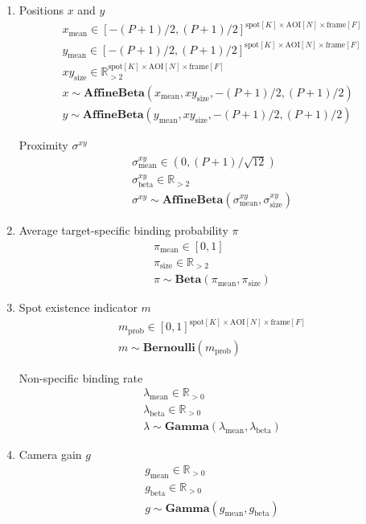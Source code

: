 \begin{enumerate}
    \item Positions $x$ and $y$
    \begin{gather*}
        x_\mathrm{mean} \in [-(P+1)/2, (P+1)/2]^{\mathrm{spot}[K] \times \mathrm{AOI}[N] \times \mathrm{frame}[F]} \\
        y_\mathrm{mean} \in [-(P+1)/2, (P+1)/2]^{\mathrm{spot}[K] \times \mathrm{AOI}[N] \times \mathrm{frame}[F]} \\
        xy_\mathrm{size} \in \mathbb{R}_{>2}^{\mathrm{spot}[K] \times \mathrm{AOI}[N] \times \mathrm{frame}[F]} \\
        x \sim \mathbf{AffineBeta} \left( x_\mathrm{mean}, xy_\mathrm{size}, -(P+1)/2, (P+1)/2 \right) \\
        y \sim \mathbf{AffineBeta} \left( y_\mathrm{mean}, xy_\mathrm{size}, -(P+1)/2, (P+1)/2 \right)
    \end{gather*}
    
    Proximity $\sigma^{xy}$
    \begin{gather*}
        \sigma^{xy}_\mathrm{mean} \in (0, (P+1) / \sqrt{12}) \\
        \sigma^{xy}_\mathrm{beta} \in \mathbb{R}_{>2} \\
        \sigma^{xy} \sim \mathbf{AffineBeta}(\sigma^{xy}_\mathrm{mean}, \sigma^{xy}_\mathrm{size})
    \end{gather*}
    
    \item Average target-specific binding probability $\pi$
    \begin{gather*}
        \pi_\mathrm{mean} \in [0, 1] \\
        \pi_\mathrm{size} \in \mathbb{R}_{>2} \\
        \pi \sim \mathbf{Beta}(\pi_\mathrm{mean}, \pi_\mathrm{size})
    \end{gather*}
    
    \item Spot existence indicator $m$
    \begin{gather*}
        m_\mathrm{prob} \in [ 0, 1 ]^{\mathrm{spot}[K] \times \mathrm{AOI}[N] \times \mathrm{frame}[F]} \\
        m \sim \mathbf{Bernoulli}(m_\mathrm{prob})
    \end{gather*}
    
    Non-specific binding rate
    \begin{gather*}
        \lambda_\mathrm{mean} \in \mathbb{R}_{>0} \\
        \lambda_\mathrm{beta} \in \mathbb{R}_{>0} \\
        \lambda \sim \mathbf{Gamma}(\lambda_\mathrm{mean}, \lambda_\mathrm{beta})
    \end{gather*}
    
    \item Camera gain $g$
    \begin{gather*}
        g_\mathrm{mean} \in \mathbb{R}_{>0} \\
        g_\mathrm{beta} \in \mathbb{R}_{>0} \\
        g \sim \mathbf{Gamma}(g_\mathrm{mean}, g_\mathrm{beta})
    \end{gather*}
\end{enumerate}

